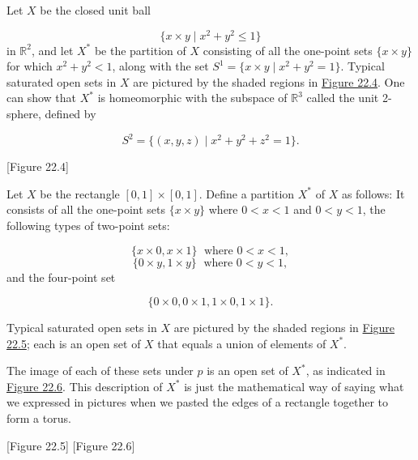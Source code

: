 \begin{centeredblock*}
\begin{example}
\label{ex:\thesection.\theexample}
 Let \(X\) be the closed unit ball

 \[
 \{ {x \times y \mid {x}^{2} + y^{2} \leq 1}\}
 \]
 in \(\mathbb{R}^{2}\), and let \(X^{ * }\) be the partition of \(X\) consisting of all the one-point sets \(\{ x \times y\}\) for which \(x^{2} + y^{2} < 1\), along with the set \(S^{1} = \{ x \times y \mid {x}^{2} + y^{2} = 1\}\). Typical saturated open sets in \(X\) are pictured by the shaded regions in \hyperref[fig:22.4]{Figure 22.4}. One can show that \(X^{ * }\) is homeomorphic with the subspace of \(\mathbb{R}^{3}\) called the unit 2-sphere, defined by

 \[
 S^{2} = \{ {( {x,y,z}) \mid {x}^{2} + y^{2} + z^{2} = 1}\}.
 \]

 [Figure 22.4]
\end{example}
\end{centeredblock*}

\begin{centeredblock*}
\begin{example}
\label{ex:\thesection.\theexample}
 Let \(X\) be the rectangle \([ {0,1}] \times [ {0,1}]\). Define a partition \(X^{ * }\) of \(X\) as follows: It consists of all the one-point sets \(\{ x \times y\}\) where \(0 < x < 1\) and \(0 < y < 1\), the following types of two-point sets:

 \[
 \{ x \times 0,x \times 1\} \;\text{ where }0 < x < 1,
 \]
 \[
 \{ 0 \times y,1 \times y\} \;\text{ where }0 < y < 1,
 \]
 and the four-point set

 \[
 \{ 0 \times 0,0 \times 1,1 \times 0,1 \times 1\}.
 \]

 Typical saturated open sets in \(X\) are pictured by the shaded regions in \hyperref[fig:22.5]{Figure 22.5}; each is an open set of \(X\) that equals a union of elements of \(X^{ * }\).

 The image of each of these sets under \(p\) is an open set of \(X^{ * }\), as indicated in \hyperref[fig:22.6]{Figure 22.6}. This description of \(X^{ * }\) is just the mathematical way of saying what we expressed in pictures when we pasted the edges of a rectangle together to form a torus.
\end{example}
\end{centeredblock*}

[Figure 22.5]
[Figure 22.6]

